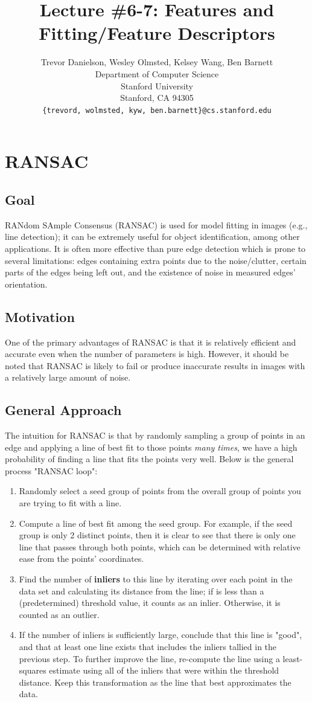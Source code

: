 \documentclass{article}
\title{Lecture \#6-7: Features and Fitting/Feature Descriptors}
\author{
  Trevor Danielson, Wesley Olmsted, Kelsey Wang, Ben Barnett \\
  Department of Computer Science\\
  Stanford University\\
  Stanford, CA 94305 \\
  \texttt{\{trevord, wolmsted, kyw, ben.barnett\}@cs.stanford.edu} \\
}
\begin{document}
\maketitle


\section{RANSAC}
\subsection{Goal}
RANdom SAmple Consensus (RANSAC) is used for model fitting in images (e.g., line detection); it can be extremely useful for object identification, among other applications. It is often more effective than pure edge detection which is prone to several limitations: edges containing extra points due to the noise/clutter, certain parts of the edges being left out, and the existence of noise in measured edges' orientation.
\subsection{Motivation}
One of the primary advantages of RANSAC is that it is relatively efficient and accurate even when the number of parameters is high. However, it should be noted that RANSAC is likely to fail or produce inaccurate results in images with a relatively large amount of noise.
\subsection{General Approach}
The intuition for RANSAC is that by randomly sampling a group of points in an edge and applying a line of best fit to those points \textit{many times}, we have a high probability of finding a line that fits the points very well. Below is the general process "RANSAC loop":
\begin{enumerate}
\item Randomly select a seed group of points from the overall group of points you are trying to fit with a line.
\item Compute a line of best fit among the seed group. For example, if the seed group is only 2 distinct points, then it is clear to see that there is only one line that passes through both points, which can be determined with relative ease from the points' coordinates.
\item Find the number of \textbf{inliers} to this line by iterating over each point in the data set and calculating its distance from the line; if is less than a (predetermined) threshold value, it counts as an inlier. Otherwise, it is counted as an outlier.
\item If the number of inliers is sufficiently large, conclude that this line is "good", and that at least one line exists that includes the inliers tallied in the previous step. To further improve the line, re-compute the line using a least-squares estimate using all of the inliers that were within the threshold distance. Keep this transformation as the line that best approximates the data.
\end{enumerate}
\end{document}
